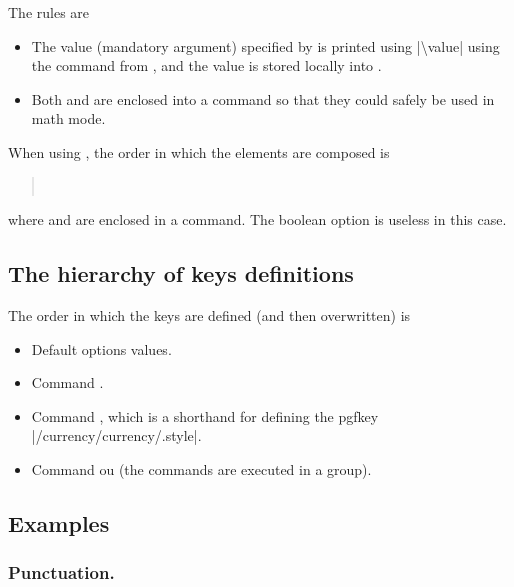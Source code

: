 \documentclass[12pt,add-index]{cnltx-doc}
\begin{document}
The rules are
\begin{itemize}[leftmargin=2em,itemsep=0pt]
    \item The value (mandatory argument) specified by  is printed
	using \verbcode|\num{\value}| using the  command from , and the value
	is stored locally into .
    \item Both  and  are enclosed into a  command
	so that they could safely be used in math mode.
\end{itemize}

When using , the order in which the elements are composed is 
\begin{quote}
    \ \ \ \ 
\end{quote}
where  and  are enclosed in a  command.
The boolean option  is useless in this case.

\subsection{The hierarchy of keys definitions}

The order in which the keys are defined (and then overwritten) is
\begin{itemize}[leftmargin=2em,itemsep=0pt]
    \item Default options values.
    \item Command .
    \item Command , which is a shorthand for defining 
	the pgfkey \verbcode|/currency/currency/.style|. 
    \item Command  ou  (the commands are executed
	in a group).
\end{itemize}

\subsection{Examples}

\subsubsection{Punctuation.}
\end{document}
